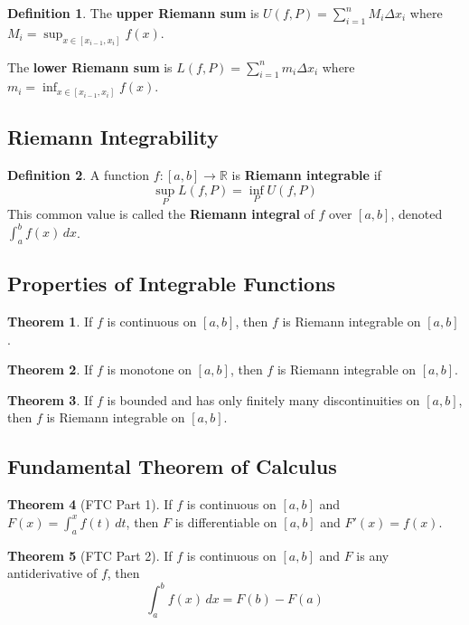 \documentclass[11pt]{article}
\theoremstyle{definition}
\newtheorem{definition}{Definition}[section]
\newtheorem{theorem}{Theorem}[section]
\begin{document}
\begin{definition}
The \textbf{upper Riemann sum} is $U(f,P) = \sum_{i=1}^n M_i \Delta x_i$ where $M_i = \sup_{x \in [x_{i-1}, x_i]} f(x)$.

The \textbf{lower Riemann sum} is $L(f,P) = \sum_{i=1}^n m_i \Delta x_i$ where $m_i = \inf_{x \in [x_{i-1}, x_i]} f(x)$.
\end{definition}

\subsection{Riemann Integrability}
\begin{definition}
A function $f: [a,b] \to \mathbb{R}$ is \textbf{Riemann integrable} if
$$\sup_P L(f,P) = \inf_P U(f,P)$$
This common value is called the \textbf{Riemann integral} of $f$ over $[a,b]$, denoted $\int_a^b f(x) \, dx$.
\end{definition}

\subsection{Properties of Integrable Functions}
\begin{theorem}
If $f$ is continuous on $[a,b]$, then $f$ is Riemann integrable on $[a,b]$.
\end{theorem}

\begin{theorem}
If $f$ is monotone on $[a,b]$, then $f$ is Riemann integrable on $[a,b]$.
\end{theorem}

\begin{theorem}
If $f$ is bounded and has only finitely many discontinuities on $[a,b]$, then $f$ is Riemann integrable on $[a,b]$.
\end{theorem}

\subsection{Fundamental Theorem of Calculus}
\begin{theorem}[FTC Part 1]
If $f$ is continuous on $[a,b]$ and $F(x) = \int_a^x f(t) \, dt$, then $F$ is differentiable on $[a,b]$ and $F'(x) = f(x)$.
\end{theorem}

\begin{theorem}[FTC Part 2]
If $f$ is continuous on $[a,b]$ and $F$ is any antiderivative of $f$, then
$$\int_a^b f(x) \, dx = F(b) - F(a)$$
\end{theorem}
\end{document}
